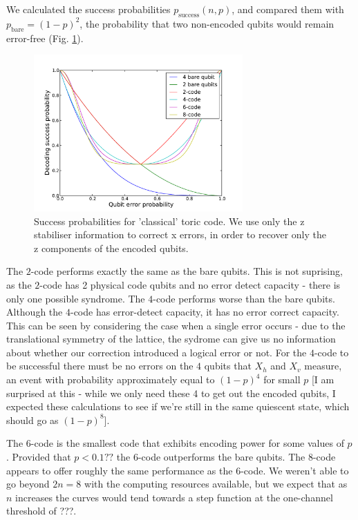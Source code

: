 We calculated the success probabilities $p_{\text{success}}(n, p)$, and compared them with $p_{\text{bare}} = (1-p)^2$, the probability that two non-encoded qubits would remain error-free (Fig. \ref{x_truthful}).

\begin{figure}[htb]
  \begin{center}
    \includegraphics[width=8cm]{assets/x_truthful.pdf}
  \end{center}
  \caption{Success probabilities for 'classical' toric code. We use only the z stabiliser information to correct x errors, in order to recover only the z components of the encoded qubits.}
  \label{x_truthful}
\end{figure}

The $2$-code performs exactly the same as the bare qubits. This is not suprising, as the $2$-code has 2 physical code qubits and no error detect capacity - there is only one possible syndrome. The $4$-code performs worse than the bare qubits. Although the $4$-code has error-detect capacity, it has no error correct capacity. This can be seen by considering the case when a single error occurs - due to the translational symmetry of the lattice, the sydrome can give us no information about whether our correction introduced a logical error or not. For the $4$-code to be successful there must be no errors on the $4$ qubits that $X_h$ and $X_v$ measure, an event with probability approximately equal to $(1-p)^4$ for small $p$ [I am surprised at this - while we only need these 4 to get out the encoded qubits, I expected these calculations to see if we're still in the same quiescent state, which should go as $(1-p)^8$].

The $6$-code is the smallest code that exhibits encoding power for some values of $p$. Provided that $p < 0.1??$ the $6$-code outperforms the bare qubits. The $8$-code appears to offer roughly the same performance as the $6$-code. We weren't able to go beyond $2n=8$ with the computing resources available, but we expect that as $n$ increases the curves would tend towards a step function at the one-channel threshold of ???.

